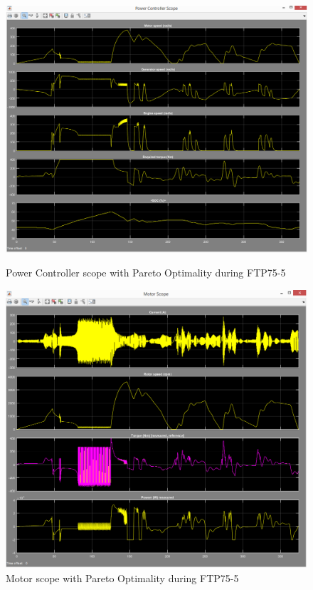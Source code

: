 \begin{figure}[hp]
\centering
\includegraphics[scale=0.4]{figures/Pareto/FTP75-5/powerController05Juli}
\caption{Power Controller scope with Pareto Optimality during FTP75-5}
\label{fig:pcpo5}
\includegraphics[scale=0.37]{figures/Pareto/FTP75-5/motor05Juli}
\caption{Motor scope with Pareto Optimality during FTP75-5}
\label{fig:mpo5}
\end{figure}

